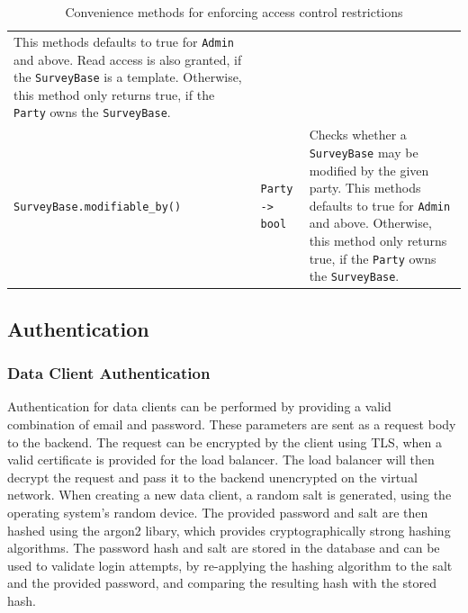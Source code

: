 \documentclass[a4paper,11pt]{article}
\def\inline{\lstinline[basicstyle=\ttfamily,keywordstyle={}]}
\begin{document}
\begin{table}
\begin{tabularx}{\textwidth}{|l|l|X|}
                        This methods defaults to true for \inline{Admin} and above.
                        Read access is also granted, if the \inline{SurveyBase} is a template.
                        Otherwise, this method only returns true, if the \inline{Party}
                        owns the \inline{SurveyBase}.\\
                        \inline{SurveyBase.modifiable_by()} & \inline{Party -> bool} & 
                        Checks whether a \inline{SurveyBase} may be modified by the given party.
                        This methods defaults to true for \inline{Admin} and above.
                        Otherwise, this method only returns true, if the \inline{Party}
                        owns the \inline{SurveyBase}.\\
                        \hline
                    \end{tabularx}
                    \caption{Convenience methods for enforcing access control restrictions}
                    \label{table:acl-convenience}
                \end{table}

        \subsection{Authentication}
            \subsubsection{Data Client Authentication}
                Authentication for data clients can be performed by providing
                a valid combination of email and password. These parameters
                are sent as a request body to the backend. The request
                can be encrypted by the client using TLS, when a valid
                certificate is provided for the load balancer. The load balancer
                will then decrypt the request and pass it to the backend unencrypted
                on the virtual network. When creating a new data client,
                a random salt is generated, using the operating system's
                random device. The provided password and salt are then hashed
                using the argon2 libary, which provides cryptographically
                strong hashing algorithms. The password hash and salt are stored in
                the database and can be used to validate login attempts,
                by re-applying the hashing algorithm to the salt and the provided
                password, and comparing the resulting hash with the stored hash.
\end{document}
